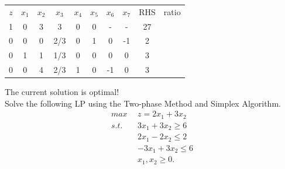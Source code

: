 \begin{center} \begin{tabular} {|c|c|c|c|c|c|c|c||c|r} \cline{1-9}
$z$	&   $x_1$ & $x_2$ & $x_3$ & $x_4$ & $x_5$ & $x_6$ & $x_7$ & RHS     &	ratio \\
\cline{1-9}
1	&     0   &    3  &	 3    & 0     & 0  &     - &	    - &  27 &	   \\
0	&	  0   &	    0 &	 2/3  &	  0   &	  1 &	    0 &  -1 &	  2     &	 \\
0	&	  1   &	    1 &	 1/3   &   0  &  0 &	   0  &	  0 &	  3   &  	\\
0	&	  0   &	    4 &	 2/3   &	1 &  0   &	  -1 &     0&	 3    &    \\
\cline{1-9}
\end{tabular} \end{center}
The current solution is optimal! \\

\bigskip Solve the following LP using the Two-phase Method and Simplex Algorithm.
\begin{align*}
max~~ & z = 2x_1 + 3x_2   \\
s.t.~~ 
& 3x_1 + 3x_2 \ge 6  \\
& 2x_1 - 2x_2 \le 2  \\
& -3x_1 + 3x_2 \le 6   \\
& x_1, x_2 \ge 0. 
\end{align*}



